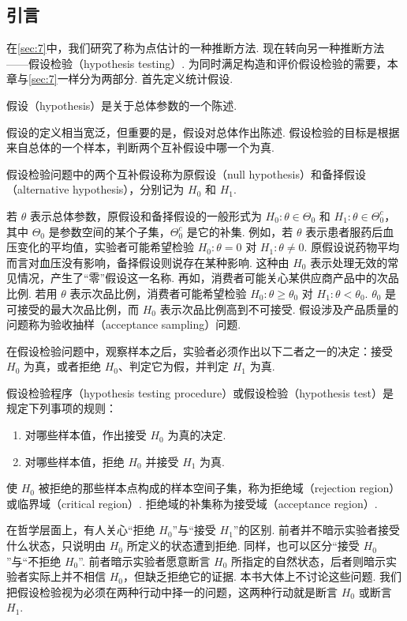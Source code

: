 \subsection{引言}\label{sec:8.1}
在\autoref{sec:7}中，我们研究了称为点估计的一种推断方法. 现在转向另一种推断方法——假设检验（hypothesis testing\mbox{）.} 为同时满足构造和评价假设检验的需要，本章与\autoref{sec:7}一样分为两部分. 首先定义统计假设.
\begin{definition}\label{def:8.1.1}
假设（hypothesis）是关于总体参数的一个陈述.
\end{definition}
假设的定义相当宽泛，但重要的是，假设对总体作出陈述. 假设检验的目标是根据来自总体的一个样本，判断两个互补假设中哪一个为真.
\begin{definition}\label{def:8.1.2}
假设检验问题中的两个互补假设称为原假设（null hypothesis）和备择假设（alternative hypothesis），分别记为 $H_0$ 和 $H_1$.
\end{definition}
若 $\theta$ 表示总体参数，原假设和备择假设的一般形式为 $H_0:\theta\in\Theta_0$ 和 $H_1:\theta\in\Theta_0^c$，其中 $\Theta_0$ 是参数空间的某个子集，$\Theta_0^c$ 是它的补集. 例如，若 $\theta$ 表示患者服药后血压变化的平均值，实验者可能希望检验 $H_0:\theta=0$ 对 $H_1:\theta\ne0$. 原假设说药物平均而言对血压没有影响，备择假设则说存在某种影响. 这种由 $H_0$ 表示处理无效的常见情况，产生了“零”假设这一名称. 再如，消费者可能关心某供应商产品中的次品比例. 若用 $\theta$ 表示次品比例，消费者可能希望检验 $H_0:\theta\ge\theta_0$ 对 $H_1:\theta<\theta_0$. $\theta_0$ 是可接受的最大次品比例，而 $H_0$ 表示次品比例高到不可接受. 假设涉及产品质量的问题称为验收抽样（acceptance sampling）问题.

在假设检验问题中，观察样本之后，实验者必须作出以下二者之一的决定：接受 $H_0$ 为真，或者拒绝 $H_0$、判定它为假，并判定 $H_1$ 为真.
\begin{definition}\label{def:8.1.3}
假设检验程序（hypothesis testing procedure）或假设检验（hypothesis test）是规定下列事项的规则：
\begin{enumerate}[label=\roman*.]
\item 对哪些样本值，作出接受 $H_0$ 为真的决定.
\item 对哪些样本值，拒绝 $H_0$ 并接受 $H_1$ 为真.
\end{enumerate}
使 $H_0$ 被拒绝的那些样本点构成的样本空间子集，称为拒绝域（rejection region）或临界域（critical region\mbox{）.} 拒绝域的补集称为接受域（acceptance region\mbox{）.}
\end{definition}
在哲学层面上，有人关心“拒绝 $H_0$”与“接受 $H_1$”的区别. 前者并不暗示实验者接受什么状态，只说明由 $H_0$ 所定义的状态遭到拒绝. 同样，也可以区分“接受 $H_0$”与“不拒绝 $H_0$”. 前者暗示实验者愿意断言 $H_0$ 所指定的自然状态，后者则暗示实验者实际上并不相信 $H_0$，但缺乏拒绝它的证据. 本书大体上不讨论这些问题. 我们把假设检验视为必须在两种行动中择一的问题，这两种行动就是断言 $H_0$ 或断言 $H_1$.


